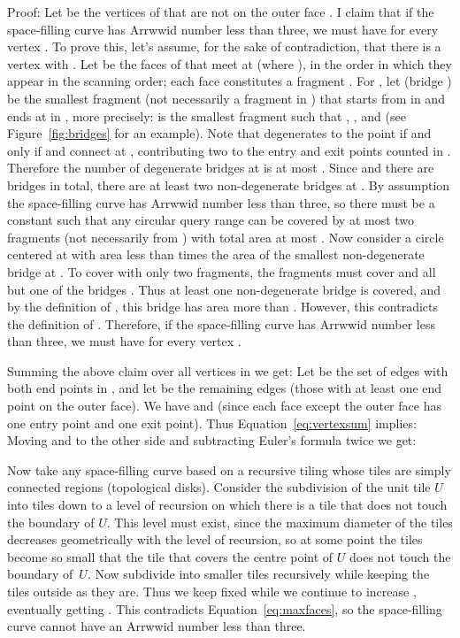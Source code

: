 \documentclass[11pt,a4paper]{article}
\newcommand{\unittile}{\ensuremath{U}\xspace}
\newenvironment{proof}{Proof:}{\qed}
\def\squareforqed{\hbox{\rlap{}}}
\def\qed{\ifmmode\squareforqed\else{\unskip\nobreak\hfil
\penalty50\hskip1em\null\nobreak\hfil\squareforqed
\parfillskip=0pt\finalhyphendemerits=0\endgraf}\fi}
\begin{document}
\begin{proof}
Let  be the vertices of  that are not on the outer face . I claim that if the space-filling curve has Arrwwid number less than three, we must have  for every vertex . To prove this, let's assume, for the sake of contradiction, that there is a vertex  with . Let  be the faces of  that meet at  (where ), in the order in which they appear in the scanning order; each face  constitutes a fragment . For , let  (bridge ) be the smallest fragment  (not necessarily a fragment in ) that starts from  in  and ends at  in , more precisely:  is the smallest fragment  such that , , and  (see Figure~\ref{fig:bridges} for an example). Note that  degenerates to the point  if and only if  and  connect at , contributing two to the entry and exit points counted in . Therefore the number of degenerate bridges at  is at most . Since  and there are  bridges in total, there are at least two non-degenerate bridges at . By assumption the space-filling curve has Arrwwid number less than three, so there must be a constant  such that any circular query range  can be covered by at most two fragments (not necessarily from ) with total area at most . Now consider a circle  centered at  with area less than  times the area of the smallest non-degenerate bridge at . To cover  with only two fragments, the fragments must cover  and all but one of the bridges . Thus at least one non-degenerate bridge is covered, and by the definition of , this bridge has area more than . However, this contradicts the definition of . Therefore, if the space-filling curve has Arrwwid number less than three, we must have  for every vertex .

Summing the above claim over all vertices in  we get:
Let  be the set of edges with both end points in , and let  be the remaining edges (those with at least one end point on the outer face). We have  and  (since each face except the outer face has one entry point and one exit point). Thus Equation~\ref{eq:vertexsum} implies:
Moving  and  to the other side and subtracting Euler's formula  twice we get:

Now take any space-filling curve based on a recursive tiling whose tiles are simply connected regions (topological disks). Consider the subdivision of the unit tile \unittile into tiles down to a level of recursion on which there is a tile  that does not touch the boundary of \unittile. This level must exist, since the maximum diameter of the tiles decreases geometrically with the level of recursion, so at some point the tiles become so small that the tile that covers the centre point of \unittile does not touch the boundary of~\unittile. Now subdivide  into smaller tiles recursively while keeping the tiles outside  as they are. Thus we keep  fixed while we continue to increase , eventually getting . This contradicts Equation~\ref{eq:maxfaces}, so the space-filling curve cannot have an Arrwwid number less than three.
\end{proof}
\end{document}
